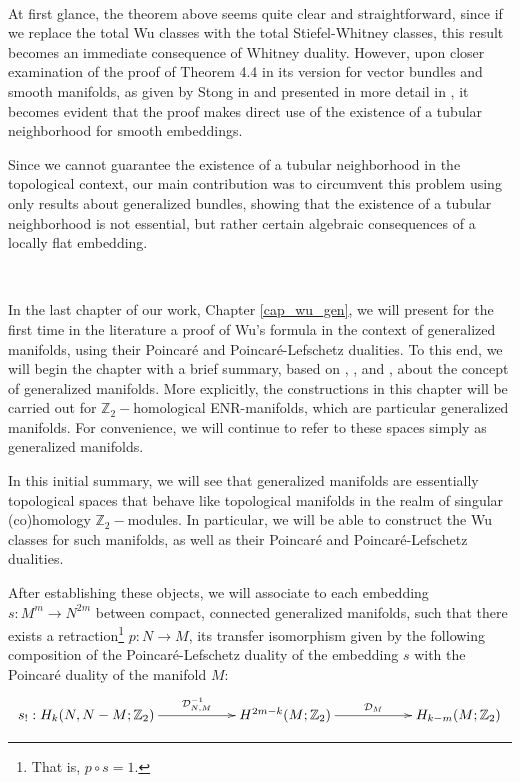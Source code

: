 \documentclass[12pt,oneside]{book}
\newcommand{\Z}{\mathbb{Z}}
\begin{document}
    \
    
    At first glance, the theorem above seems quite clear and straightforward, since if we replace the 
    total Wu classes with the total Stiefel-Whitney classes, this result becomes an immediate consequence 
    of Whitney duality. However, upon closer examination of the proof of Theorem 4.4 in its version for 
    vector bundles and smooth manifolds, as given by Stong in \cite{stong} and presented in more detail 
    in \cite{joao}, it becomes evident that the proof makes direct use of the existence of a tubular 
    neighborhood for smooth embeddings.

    Since we cannot guarantee the existence of a tubular neighborhood in the topological context, our 
    main contribution was to circumvent this problem using only results about generalized bundles, 
    showing that the existence of a tubular neighborhood is not essential, but rather certain algebraic 
    consequences of a locally flat embedding.

    \
    
    In the last chapter of our work, Chapter \ref{cap_wu_gen}, we will present for the first time in the 
    literature a proof of Wu's formula in the context of generalized manifolds, using their Poincaré and 
    Poincaré-Lefschetz dualities. To this end, we will begin the chapter with a brief summary, based 
    on \cite{biasi}, \cite{denise}, and \cite{bredon_2}, about the concept of generalized manifolds. 
    More explicitly, the constructions in this chapter will be carried out for $\Z_{2}-$homological 
    ENR-manifolds, which are particular generalized manifolds. For convenience, we will continue to 
    refer to these spaces simply as generalized manifolds.

    In this initial summary, we will see that generalized manifolds are essentially topological spaces 
    that behave like topological manifolds in the realm of singular (co)homology $\Z_{2}-$modules. In 
    particular, we will be able to construct the Wu classes for such manifolds, as well as their Poincaré 
    and Poincaré-Lefschetz dualities.

    After establishing these objects, we will associate to each embedding $s:M^{m}\to N^{2m}$ between 
    compact, connected generalized manifolds, such that there exists a retraction\footnote{That is, 
    $p\circ s=1$.} $p:N\to M$, its transfer isomorphism given by the following composition of the 
    Poincaré-Lefschetz duality of the embedding $s$ with the Poincaré duality of the manifold $M$:
    $$ \xymatrix @C=0.5cm {
    s_{!}:H_{k}(N,N-M;\Z_{2}) \ar[rrr]^-{\mathcal{D}^{-1}_{N,M}} &&& H^{2m-k}(M;\Z_{2}) \ar[rrr]^-{\mathcal{D}_{M}} &&& H_{k-m}(M;\Z_{2})
    } $$
\end{document}
